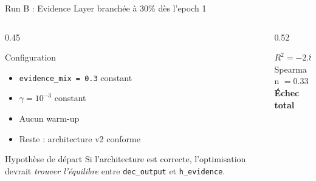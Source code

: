 \documentclass[10pt]{beamer}
\begin{document}
\begin{frame}{Run B : Evidence Layer branchée à 30\% dès l'epoch 1}
  \begin{columns}
    \begin{column}{0.45\textwidth}
      \begin{block}{Configuration}
        \footnotesize
        \begin{itemize}
          \item \texttt{evidence\_mix = 0.3} constant
          \item $\gamma = 10^{-3}$ constant
          \item \alert{Aucun warm-up}
          \item Reste : architecture v2 conforme
        \end{itemize}
      \end{block}

      \begin{exampleblock}{Hypothèse de départ}
        \footnotesize
        Si l'architecture est correcte, l'optimisation devrait \emph{trouver l'équilibre} entre \texttt{dec\_output} et \texttt{h\_evidence}.
      \end{exampleblock}
    \end{column}
    \begin{column}{0.52\textwidth}

      \vspace{6pt}
      \begin{problembox}
        \centering\small
        $R^2 = -2.83$\\
        Spearman $= 0.33$\\
        \textbf{Échec total}
      \end{problembox}
    \end{column}
  \end{columns}
\end{frame}
\end{document}
